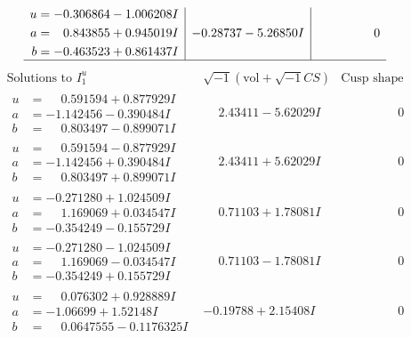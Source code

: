 \documentclass[1p]{elsarticle_modified}
\theoremstyle{definition}
\newcommand{\I}{\sqrt{-1}}
\begin{document}
$$\begin{array}{c|c|c}
\begin{aligned}
u &= -0.306864 - 1.006208 I \\
a &= \phantom{-}0.843855 + 0.945019 I \\
b &= -0.463523 + 0.861437 I\end{aligned}
 & -0.28737 - 5.26850 I & \phantom{-0.000000 } 0\\
 \hline 
 \end{array}$$\newpage$$\begin{array}{c|c|c}  
\text{Solutions to }I^u_{1}& \I (\text{vol} + \sqrt{-1}CS) & \text{Cusp shape}\\
 \hline 
\begin{aligned}
u &= \phantom{-}0.591594 + 0.877929 I \\
a &= -1.142456 - 0.390484 I \\
b &= \phantom{-}0.803497 - 0.899071 I\end{aligned}
 & \phantom{-}2.43411 - 5.62029 I & \phantom{-0.000000 } 0 \\ \hline\begin{aligned}
u &= \phantom{-}0.591594 - 0.877929 I \\
a &= -1.142456 + 0.390484 I \\
b &= \phantom{-}0.803497 + 0.899071 I\end{aligned}
 & \phantom{-}2.43411 + 5.62029 I & \phantom{-0.000000 } 0 \\ \hline\begin{aligned}
u &= -0.271280 + 1.024509 I \\
a &= \phantom{-}1.169069 + 0.034547 I \\
b &= -0.354249 - 0.155729 I\end{aligned}
 & \phantom{-}0.71103 + 1.78081 I & \phantom{-0.000000 } 0 \\ \hline\begin{aligned}
u &= -0.271280 - 1.024509 I \\
a &= \phantom{-}1.169069 - 0.034547 I \\
b &= -0.354249 + 0.155729 I\end{aligned}
 & \phantom{-}0.71103 - 1.78081 I & \phantom{-0.000000 } 0 \\ \hline\begin{aligned}
u &= \phantom{-}0.076302 + 0.928889 I \\
a &= -1.06699 + 1.52148 I \\
b &= \phantom{-}0.0647555 - 0.1176325 I\end{aligned}
 & -0.19788 + 2.15408 I & \phantom{-0.000000 } 0 \\ \hline\begin{aligned}

\end{aligned}
\end{array}$$
\end{document}
